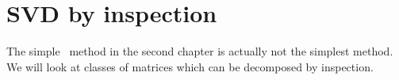 \section{SVD by inspection}
The simple \svdl \ method in the second chapter is actually not the simplest method. We will look at classes of matrices which can be decomposed by inspection.

\endinput